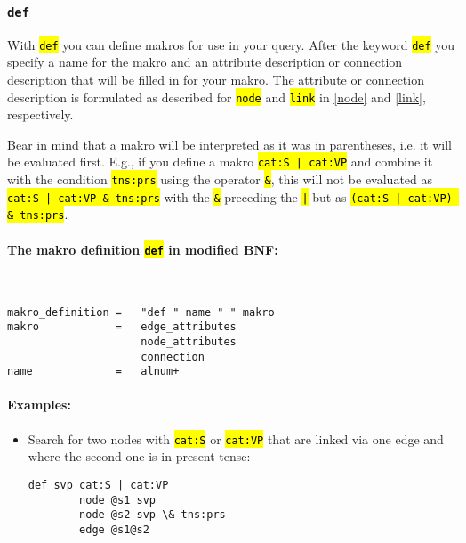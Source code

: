 \documentclass[12pt]{scrartcl}
\newcommand{\code}[1]{\hl{\texttt{#1}}}
\begin{document}
\subsubsection{\texttt{def}}\label{def}

With \code{def} you can define makros for use in your query.
After the keyword \code{def} you specify a name for the makro and an attribute description or connection description that will be filled in for your makro.
The attribute or connection description is formulated as described for \code{node} and \code{link} in \ref{node} and \ref{link}, respectively.

Bear in mind that a makro will be interpreted as it was in parentheses, i.e. it will be evaluated first.
E.g., if you define a makro \code{cat:S | cat:VP} and combine it with the condition \code{tns:prs} using the operator \code{\&}, this will not be evaluated as \code{cat:S | cat:VP \& tns:prs} with the \code{\&} preceding the \code{|} but as \code{(cat:S | cat:VP) \& tns:prs}.

\paragraph*{The makro definition \code{def} in modified BNF:}
~
\begin{lstlisting}
makro_definition =   "def " name " " makro
makro            =   edge_attributes
                     node_attributes
                     connection
name             =   alnum+
\end{lstlisting}


\paragraph*{Examples:}
\begin{itemize}
	\item Search for two nodes with \code{cat:S} or \code{cat:VP} that are linked via one edge and where the second one is in present tense:
	\begin{lstlisting}[gobble=8,aboveskip=.6em,belowskip=.2em]
		def svp cat:S | cat:VP
		node @s1 svp
		node @s2 svp \& tns:prs
		edge @s1@s2
	\end{lstlisting}
\end{itemize}
\end{document}
